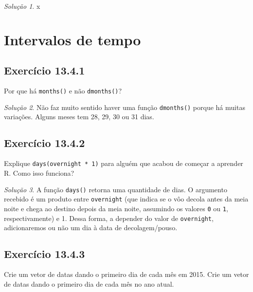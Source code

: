 \documentclass[
]{latex/krantz}
\theoremstyle{definition}
\theoremstyle{definition}
\theoremstyle{definition}
\theoremstyle{definition}
\theoremstyle{remark}
\newtheorem*{solution}{Solução}
\begin{document}
\begin{solution}
x
\end{solution}

\hypertarget{intervalos-de-tempo}{%
\section{Intervalos de tempo}\label{intervalos-de-tempo}}

\hypertarget{exr13-4-1}{%
\subsection*{Exercício 13.4.1}\label{exr13-4-1}}

Por que há \texttt{months()} e não \texttt{dmonths()}?

\begin{solution}
Não faz muito sentido haver uma função \texttt{dmonths()} porque há muitas variações. Alguns meses tem 28, 29, 30 ou 31 dias.
\end{solution}

\hypertarget{exr13-4-2}{%
\subsection*{Exercício 13.4.2}\label{exr13-4-2}}

Explique \texttt{days(overnight\ *\ 1)} para alguém que acabou de começar a aprender R. Como isso funciona?

\begin{solution}
A função \texttt{days()} retorna uma quantidade de dias. O argumento recebido é um produto entre \texttt{overnight} (que indica se o vôo decola antes da meia noite e chega ao destino depois da meia noite, assumindo os valores \texttt{0} ou \texttt{1}, respectivamente) e 1. Dessa forma, a depender do valor de \texttt{overnight}, adicionaremos ou não um dia à data de decolagem/pouso.
\end{solution}

\hypertarget{exr13-4-3}{%
\subsection*{Exercício 13.4.3}\label{exr13-4-3}}

Crie um vetor de datas dando o primeiro dia de cada mês em 2015. Crie um vetor de datas dando o primeiro dia de cada mês no ano atual.
\end{document}
